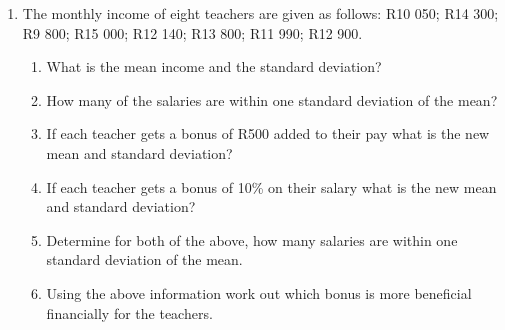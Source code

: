 \begin{enumerate}
\item The monthly income of eight teachers are given as follows: \newline
R10 050; R14 300; R9 800; R15 000; R12 140; R13 800; R11 990; R12 900.
	\begin{enumerate}
	\item What is the mean income and the standard deviation? 
	\item How many of the salaries are within one standard deviation of the mean?
	\item If each teacher gets a bonus of R500 added to their pay what is the new mean and standard deviation?
	\item If each teacher gets a bonus of 10\% on their salary what is the new mean and standard deviation? 
	\item Determine for both of the above, how many salaries are within one standard deviation of the mean.
	\item Using the above information work out which bonus is more beneficial financially for the teachers.
	\end{enumerate}
\end{enumerate}









